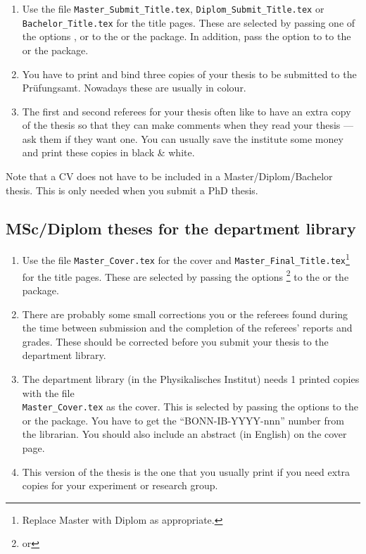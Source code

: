 \begin{enumerate}
\item Use the file \texttt{Master\_Submit\_Title.tex},
  \texttt{Diplom\_Submit\_Title.tex} or\\
  \texttt{Bachelor\_Title.tex} for the title pages.
  These are selected by passing one of the options
  ,  or 
  to the  or the  package.
  In addition, pass the option  to 
  to the  or the  package.
\item You have to print and bind three copies of your thesis
  to be submitted to the
  \foreignlanguage{ngerman}{Prüfungsamt}. Nowadays these are usually in
  colour.
\item The first and second referees for your thesis often like to
  have an extra copy of the thesis so that they can make comments when they read
  your thesis --- ask them if they want one. You can usually save the
  institute some money and print these copies in black \& white.
\end{enumerate}

Note that a CV does not have to be included in a Master/Diplom/Bachelor
thesis. This is only needed when you submit a PhD thesis.


\subsection{MSc/Diplom theses for the department library}

\begin{enumerate}
\item Use the file \texttt{Master\_Cover.tex} for the cover and
  \texttt{Master\_Final\_Title.tex}\footnote{Replace Master with Diplom
    as appropriate.} for the title pages.
  These are selected by passing the options \footnote{%
    or }
  to the  or the  package.
\item There are probably some small corrections you or the referees
  found during the time between submission and the completion of the
  referees' reports and grades. These should be corrected before you
  submit your thesis to the department library.
\item The department
  library (in the Physikalisches
  Institut) needs 1 printed copies with the file\\
  \texttt{Master\_Cover.tex} as the cover.
  This is selected by passing the options 
  to the  or the  package.
  You have to get
  the \enquote{BONN-IB-YYYY-nnn} number from the librarian. You
  should also include an abstract (in English) on the cover page.
\item This version of the thesis is the one that you usually print if
  you need extra copies for your experiment or research group.
\end{enumerate}


